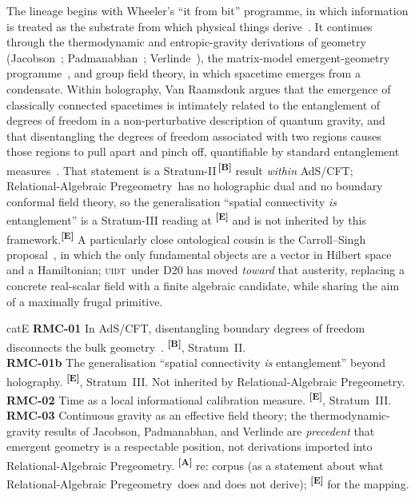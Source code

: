 \documentclass[12pt,a4paper,twoside]{article}
\theoremstyle{plain}
\theoremstyle{definition}
\theoremstyle{remark}
\newcommand{\ProjectShort}{Relational-Algebraic Pregeometry}
\newcommand{\RAP}{\ProjectShort}
\newcommand{\UIDT}{\textsc{uidt}} %
\newcommand{\catmark}[1]{\textsuperscript{\textsf{\textbf{[#1]}}}}
\begin{document}
The lineage begins with Wheeler's ``it from bit'' programme, in which
information is treated as the substrate from which physical things
derive~\cite{wheeler1990}. It continues through the thermodynamic and
entropic-gravity derivations of geometry
(Jacobson~\cite{jacobson1995}; Padmanabhan~\cite{padmanabhan2010};
Verlinde~\cite{verlinde2011}), the matrix-model emergent-geometry
programme~\cite{ikkt1997,steinacker2010}, and group field theory, in
which spacetime emerges from a condensate. Within holography, Van
Raamsdonk argues that the emergence of classically connected spacetimes
is intimately related to the entanglement of degrees of freedom in a
non-perturbative description of quantum gravity, and that disentangling
the degrees of freedom associated with two regions causes those regions
to pull apart and pinch off, quantifiable by standard entanglement
measures~\cite{vanraamsdonk2010}. That statement is a
Stratum-II\,\catmark{B} result \emph{within} AdS/CFT; \RAP\ has no
holographic dual and no boundary conformal field theory, so the
generalisation ``spatial connectivity \emph{is} entanglement'' is a
Stratum-III reading at \catmark{E} and is not inherited by this
framework.\catmark{E} A particularly close ontological cousin is the
Carroll--Singh proposal~\cite{carrollsingh2018}, in which the only
fundamental objects are a vector in Hilbert space and a Hamiltonian;
\UIDT\ under D20 has moved \emph{toward} that austerity, replacing a
concrete real-scalar field with a finite algebraic candidate, while
sharing the aim of a maximally frugal primitive.

\begin{evidencebox}{catE}
\textbf{RMC-01} In AdS/CFT, disentangling boundary degrees of freedom
disconnects the bulk geometry~\cite{vanraamsdonk2010}. \catmark{B},
Stratum~II.\\[0.25em]
\textbf{RMC-01b} The generalisation ``spatial connectivity \emph{is}
entanglement'' beyond holography. \catmark{E}, Stratum~III. Not inherited
by \RAP.\\[0.25em]
\textbf{RMC-02} Time as a local informational calibration measure.
\catmark{E}, Stratum~III.\\[0.25em]
\textbf{RMC-03} Continuous gravity as an effective field theory; the
thermodynamic-gravity results of Jacobson, Padmanabhan, and Verlinde are
\emph{precedent} that emergent geometry is a respectable position, not
derivations imported into \RAP. \catmark{A} re: corpus (as a statement
about what \RAP\ does and does not derive); \catmark{E} for the mapping.
\end{evidencebox}
\end{document}
